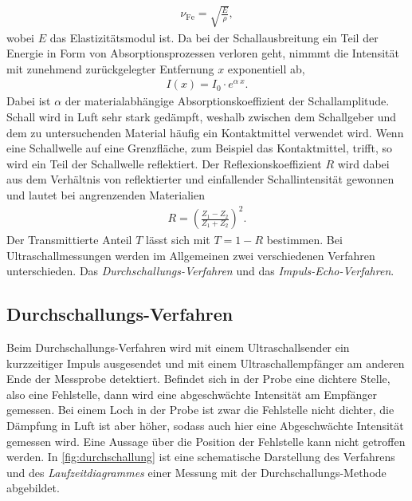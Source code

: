 \begin{align}
    \label{eqn:SchallFest}
    \nu_{\text{Fe}} = \sqrt{\frac E\rho},
\end{align}
wobei $E$ das Elastizitätsmodul ist. Da bei der Schallausbreitung ein Teil der Energie in Form von Absorptionsprozessen verloren geht, nimmmt die Intensität mit zunehmend zurückgelegter Entfernung $x$ exponentiell ab,
\begin{align}
    \label{eqn:intensitaetsverlust}
    I(x)=I_0\cdot e^{\alpha ~ x}.
\end{align}
Dabei ist $\alpha$ der materialabhängige Absorptionskoeffizient der Schallamplitude. \newline
Schall wird in Luft sehr stark gedämpft, weshalb zwischen dem Schallgeber und dem zu untersuchenden Material häufig ein Kontaktmittel verwendet wird. Wenn eine Schallwelle auf eine Grenzfläche, zum Beispiel das Kontaktmittel, trifft, so wird
ein Teil der Schallwelle reflektiert. Der Reflexionskoeffizient $R$ wird dabei aus dem Verhältnis von reflektierter und einfallender Schallintensität gewonnen und lautet bei angrenzenden Materialien
\begin{align}
    \label{eqn:Reflexionskoeffizient}
    R=\left(\frac{Z_1-Z_2}{Z_1+Z_2}\right)^2.
\end{align}
Der Transmittierte Anteil $T$ lässt sich mit $T=1-R$ bestimmen. \newline
Bei Ultraschallmessungen werden im Allgemeinen zwei verschiedenen Verfahren unterschieden. Das \textit{Durchschallungs-Verfahren} und das \textit{Impuls-Echo-Verfahren}.

\subsection*{Durchschallungs-Verfahren}
\label{subsec:durchschallungVerfahren}
Beim Durchschallungs-Verfahren wird mit einem Ultraschallsender ein kurzzeitiger Impuls ausgesendet und mit einem Ultraschallempfänger am anderen Ende der Messprobe detektiert.
Befindet sich in der Probe eine dichtere Stelle, also eine Fehlstelle, dann wird eine abgeschwächte Intensität am Empfänger gemessen. Bei einem Loch in der Probe ist zwar die Fehlstelle nicht dichter, die Dämpfung in Luft
ist aber höher, sodass auch hier eine Abgeschwächte Intensität gemessen wird. Eine Aussage über die Position der Fehlstelle kann nicht getroffen werden.
In \autoref{fig:durchschallung} ist eine schematische Darstellung des Verfahrens und des \textit{Laufzeitdiagrammes} einer Messung mit der Durchschallungs-Methode abgebildet.

